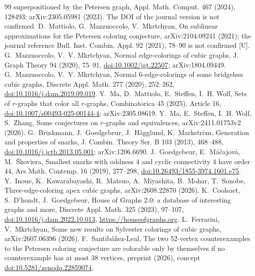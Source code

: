 \documentclass[11pt]{article}
\theoremstyle{definition}
\theoremstyle{remark}
\newcommand{\claim}[1]{\textup{[#1]}}
\begin{document}
\begin{thebibliography}{99}
superpositioned by the Petersen graph, Appl. Math. Comput. 467 (2024), 128493; arXiv:2305.05981 (2023). The DOI of the journal version is not confirmed.
 D.~Mattiolo, G.~Mazzuoccolo, V.~Mkrtchyan, On sublinear approximations for the
Petersen coloring conjecture, arXiv:2104.09241 (2021); the journal reference Bull. Inst. Combin. Appl. 92 (2021), 78--90 is not confirmed \claim{U}.
 G.~Mazzuoccolo, V.~V. Mkrtchyan, Normal edge-colorings of cubic graphs, J. Graph
Theory 94 (2020), 75--91, \href{https://doi.org/10.1002/jgt.22507}{doi:10.1002/jgt.22507}; arXiv:1804.09449.
 G.~Mazzuoccolo, V.~V. Mkrtchyan, Normal 6-edge-colorings of some bridgeless cubic
graphs, Discrete Appl. Math. 277 (2020), 252--262, \href{https://doi.org/10.1016/j.dam.2019.09.019}{doi:10.1016/j.dam.2019.09.019}.
 Y.~Ma, D.~Mattiolo, E.~Steffen, I.~H. Wolf, Sets of $r$-graphs that color all
$r$-graphs, Combinatorica 45 (2025), Article 16,
\href{https://doi.org/10.1007/s00493-025-00144-4}{doi:10.1007/s00493-025-00144-4}; arXiv:2305.08619.
 Y.~Ma, E.~Steffen, I.~H. Wolf, S.~Zhang, Some conjectures on $r$-graphs and
equivalences, arXiv:2411.01753v2 (2026).
 G.~Brinkmann, J.~Goedgebeur, J.~H\"agglund, K.~Markstr\"om, Generation and
properties of snarks, J. Combin. Theory Ser. B 103 (2013), 468--488,
\href{https://doi.org/10.1016/j.jctb.2013.05.001}{doi:10.1016/j.jctb.2013.05.001}; arXiv:1206.6690.
 J.~Goedgebeur, E.~M\'a\v{c}ajov\'a, M.~\v{S}koviera, Smallest snarks with oddness 4
and cyclic connectivity 4 have order 44, Ars Math. Contemp. 16 (2019), 277--298, \href{https://doi.org/10.26493/1855-3974.1601.e75}{doi:10.26493/1855-3974.1601.e75}.
 Y.~Inoue, K.~Kawarabayashi, R.~Matsuo, A.~Miyashita, B.~Mohar, T.~Sonobe,
Three-edge-coloring apex cubic graphs, arXiv:2608.22870 (2026).
 K.~Coolsaet, S.~D'hondt, J.~Goedgebeur, House of Graphs 2.0: a database of
interesting graphs and more, Discrete Appl. Math. 325 (2023), 97--107, \href{https://doi.org/10.1016/j.dam.2022.10.013}{doi:10.1016/j.dam.2022.10.013}, \url{https://houseofgraphs.org}.
 L.~Ferrarini, V.~Mkrtchyan, Some new results on Sylvester colorings of cubic
graphs, arXiv:2607.06396 (2026).
 F.~Santib\'a\~nez-Leal, The two 52-vertex counterexamples to the Petersen coloring
conjecture are colorable only by themselves if no counterexample has at most 38 vertices, preprint (2026),
concept \href{https://doi.org/10.5281/zenodo.22859074}{doi:10.5281/zenodo.22859074}.

\end{thebibliography}
\end{document}
